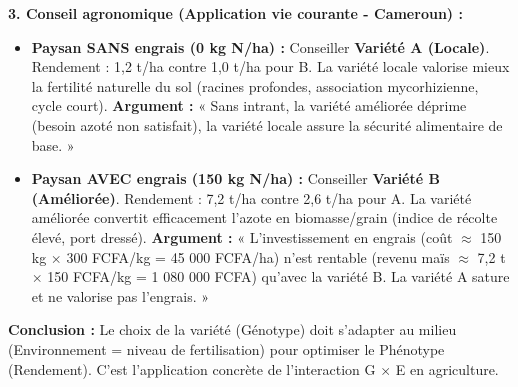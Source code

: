 \documentclass[11pt]{article}
\newcommand{\cle}[1]{{\popxbold\color{popdark}#1}}
\begin{document}
\begin{exoresolu}
\textbf{3. Conseil agronomique (Application vie courante - Cameroun) :}
\begin{itemize}
    \item \textbf{Paysan SANS engrais (0 kg N/ha) :} Conseiller \textbf{Variété A (Locale)}. Rendement : 1,2 t/ha contre 1,0 t/ha pour B. La variété locale valorise mieux la fertilité naturelle du sol (racines profondes, association mycorhizienne, cycle court). \textbf{Argument :} « Sans intrant, la variété améliorée déprime (besoin azoté non satisfait), la variété locale assure la sécurité alimentaire de base. »
    \item \textbf{Paysan AVEC engrais (150 kg N/ha) :} Conseiller \textbf{Variété B (Améliorée)}. Rendement : 7,2 t/ha contre 2,6 t/ha pour A. La variété améliorée convertit efficacement l'azote en biomasse/grain (indice de récolte élevé, port dressé). \textbf{Argument :} « L'investissement en engrais (coût $\approx$ 150 kg $\times$ 300 FCFA/kg = 45 000 FCFA/ha) n'est rentable (revenu maïs $\approx$ 7,2 t $\times$ 150 FCFA/kg = 1 080 000 FCFA) qu'avec la variété B. La variété A sature et ne valorise pas l'engrais. »
\end{itemize}
\textbf{Conclusion :} Le choix de la variété (Génotype) doit s'adapter au milieu (Environnement = niveau de fertilisation) pour optimiser le Phénotype (Rendement). C'est l'application concrète de l'interaction \cle{G $\times$ E} en agriculture.
\end{exoresolu}
\end{document}
